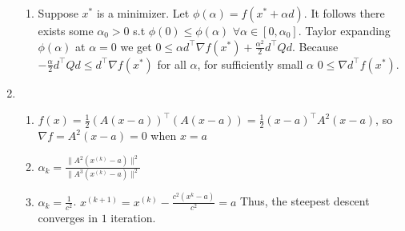 \documentclass[10pt]{article}
\begin{document}
\begin{enumerate}
\begin{enumerate}
        \item Suppose $x^*$ is a minimizer. Let $\phi(\alpha)=f(x^*+\alpha d)$. 
        It follows there exists some $\alpha_0>0$ s.t $\phi(0)\le\phi(\alpha)$ $\forall\alpha\in[0,\alpha_0]$.
        Taylor expanding $\phi(\alpha)$ at $\alpha=0$ we get $0\le \alpha d^\top \nabla f(x^*)+\frac{\alpha^2}{2}d^\top Qd$.
        Because $-\frac{\alpha}{2}d^\top Qd\le d^\top \nabla f(x^*)$ for all $\alpha$, for sufficiently small $\alpha$ $0\le \nabla d^\top f(x^*)$.
    \end{enumerate}
    \item \begin{enumerate}
        \item $f(x)=\frac{1}{2}{(A(x-a))}^\top(A(x-a))=\frac{1}{2}{(x-a)}^\top A^2(x-a)$, so $\nabla f= A^2(x-a)=0$ when $x=a$
        \item $\alpha_k=\frac{\lVert A^2(x^{(k)}-a)\rVert^2}{\lVert A^3(x^{(k)}-a)\rVert^2}$
        \item $\alpha_k=\frac{1}{c^2}$. $x^{(k+1)}=x^{(k)}-\frac{c^2(x^{k}-a)}{c^2}=a$ Thus, the steepest descent converges in $1$ iteration.
    \end{enumerate}
\end{enumerate}
\item 
\end{document}
